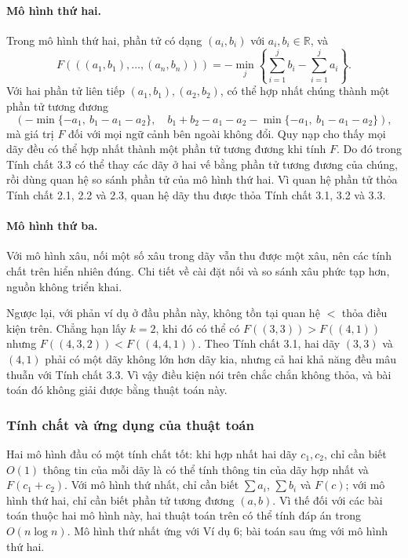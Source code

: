 \documentclass[11pt]{article}
\begin{document}
\paragraph{Mô hình thứ hai.}
Trong mô hình thứ hai, phần tử có dạng $(a_i,b_i)$ với $a_i,b_i\in\mathbb R$,
và
\[
  F(((a_1,b_1),\ldots,(a_n,b_n)))
  =
  -\min_j\left\{\sum_{i=1}^j b_i-\sum_{i=1}^j a_i\right\}.
\]
Với hai phần tử liên tiếp $(a_1,b_1),(a_2,b_2)$, có thể hợp nhất chúng thành
một phần tử tương đương
\[
  \left(
    -\min\{-a_1,\ b_1-a_1-a_2\},\quad
    b_1+b_2-a_1-a_2-\min\{-a_1,\ b_1-a_1-a_2\}
  \right),
\]
mà giá trị $F$ đối với mọi ngữ cảnh bên ngoài không đổi. Quy nạp cho thấy mọi
dãy đều có thể hợp nhất thành một phần tử tương đương khi tính $F$. Do đó trong
Tính chất 3.3 có thể thay các dãy ở hai vế bằng phần tử tương đương của chúng,
rồi dùng quan hệ so sánh phần tử của mô hình thứ hai. Vì quan hệ phần tử thỏa
Tính chất 2.1, 2.2 và 2.3, quan hệ dãy thu được thỏa Tính chất 3.1, 3.2 và 3.3.

\paragraph{Mô hình thứ ba.}
Với mô hình xâu, nối một số xâu trong dãy vẫn thu được một xâu, nên các tính
chất trên hiển nhiên đúng. Chi tiết về cài đặt nối và so sánh xâu phức tạp hơn,
nguồn không triển khai.

Ngược lại, với phản ví dụ ở đầu phần này, không tồn tại quan hệ $<$ thỏa điều
kiện trên. Chẳng hạn lấy $k=2$, khi đó có thể có
$F((3,3))>F((4,1))$ nhưng $F((4,3,2))<F((4,4,1))$. Theo Tính chất 3.1, hai dãy
$(3,3)$ và $(4,1)$ phải có một dãy không lớn hơn dãy kia, nhưng cả hai khả năng
đều mâu thuẫn với Tính chất 3.3. Vì vậy điều kiện nói trên chắc chắn không thỏa,
và bài toán đó không giải được bằng thuật toán này.

\subsubsection{Tính chất và ứng dụng của thuật toán}

Hai mô hình đầu có một tính chất tốt: khi hợp nhất hai dãy $c_1,c_2$, chỉ cần
biết $O(1)$ thông tin của mỗi dãy là có thể tính thông tin của dãy hợp nhất và
$F(c_1+c_2)$. Với mô hình thứ nhất, chỉ cần biết
$\sum a_i$, $\sum b_i$ và $F(c)$; với mô hình thứ hai, chỉ cần biết phần tử
tương đương $(a,b)$. Vì thế đối với các bài toán thuộc hai mô hình này, hai
thuật toán trên có thể tính đáp án trong $O(n\log n)$. Mô hình thứ nhất ứng với
Ví dụ 6; bài toán sau ứng với mô hình thứ hai.
\end{document}
